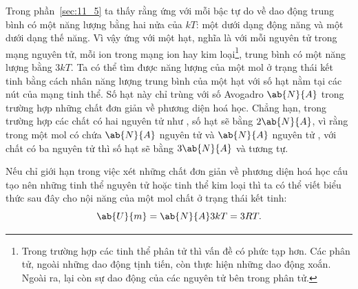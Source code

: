 
Trong phần~\ref{sec:11_5} ta thấy rằng ứng với mỗi bậc tự do về dao động trung bình có một năng lượng bằng hai nửa của $kT$: một dưới dạng động năng và một dưới dạng thế năng. Vì vậy ứng với một hạt, nghĩa là với mỗi nguyên tử trong mạng nguyên tử, mỗi ion trong mạng ion hay kim loại\footnote{Trong trường hợp các tinh thể phân tử thì vấn đề có phức tạp hơn. Các phân tử, ngoài những dao động tịnh tiến, còn thực hiện những dao động xoắn. Ngoài ra, lại còn sự dao động của các nguyên tử bên trong phân tử.}, trung bình có một năng lượng bằng $3kT$. Ta có thể tìm được năng lượng của một mol ở trạng thái kết tinh bằng cách nhân năng lượng trung bình của một hạt với số hạt nằm tại các nút của mạng tinh thể. Số hạt này chỉ trùng với số Avogadro $\ab{N}{A}$ trong trường hợp những chất đơn giản về phương diện hoá học. Chẳng hạn, trong trường hợp các chất có hai nguyên tử như , số hạt sẽ bằng $2\ab{N}{A}$, vì rằng trong một mol  có chứa $\ab{N}{A}$ nguyên tử  và $\ab{N}{A}$ nguyên tử , với chất có ba nguyên tử thì số hạt sẽ bằng $3\ab{N}{A}$ và tương tự.


Nếu chỉ giới hạn trong việc xét những chất đơn giản về phương diện hoá học cấu tạo nên những tinh thể nguyên tử hoặc tinh thể kim loại thì ta có thể viết biểu thức sau đây cho nội năng của một mol chất ở trạng thái kết tinh: 
\begin{equation*}
	\ab{U}{m} = \ab{N}{A} 3kT = 3RT.
\end{equation*}

